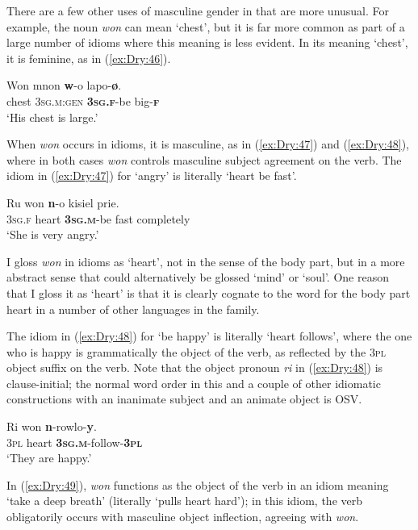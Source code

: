 \documentclass[output=collectionpaper]{langsci/langscibook}
\begin{document}
There are a few other uses of masculine gender in  that are more unusual. For example, the noun \textit{won} can mean `chest', but it is far more common as part of a large number of idioms where this meaning is less evident. In its meaning `chest', it is feminine, as in (\ref{ex:Dry:46}).

\ea \label{ex:Dry:46}
\gll Won	mnon	\textbf{w}-o	lapo-\textbf{ø}.\\
chest \textsc{3sg.m:gen} \textbf{\textsc{3sg.f}}-be big-\textbf{\textsc{f}}\\
\glt `His chest is large.'
\z

When \textit{won} occurs in idioms, it is masculine, as in (\ref{ex:Dry:47}) and (\ref{ex:Dry:48}), where in both cases \textit{won} controls masculine subject agreement on the verb. The idiom in (\ref{ex:Dry:47}) for `angry' is literally `heart be fast'.

\ea \label{ex:Dry:47}
\gll Ru	won	\textbf{n}-o	kisiel	prie.\\
\textsc{3sg.f} heart \textbf{\textsc{3sg.m}}-be fast completely\\
\glt `She is very angry.'
\z

I gloss \textit{won} in idioms as `heart', not in the sense of the body part, but in a more abstract sense that could alternatively be glossed `mind' or `soul'. One reason that I gloss it as `heart' is that it is clearly cognate to the word for the body part heart in a number of other languages in the  family.

The idiom in (\ref{ex:Dry:48}) for `be happy' is literally `heart follows', where the one who is happy is grammatically the object of the verb, as reflected by the \textsc{3pl} object suffix on the verb. Note that the object pronoun \textit{ri} in (\ref{ex:Dry:48}) is clause-initial; the normal word order in this and a couple of other idiomatic constructions with an inanimate subject and an animate object is OSV.

\ea    \label{ex:Dry:48}
\gll Ri	won	\textbf{n}-rowlo-\textbf{y}.\\
\textsc{3pl} heart \textbf{\textsc{3sg.m}}-follow-\textbf{\textsc{3pl}}\\
\glt `They are happy.'
\z

In (\ref{ex:Dry:49}), \textit{won} functions as the object of the verb in an idiom meaning `take a deep breath' (literally `pulls heart hard'); in this idiom, the verb obligatorily occurs with masculine object inflection, agreeing with \textit{won}.
\end{document}
